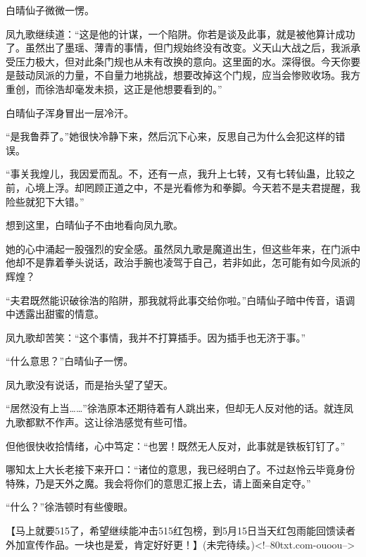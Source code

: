 \begin{this_body}
白晴仙子微微一愣。

凤九歌继续道：“这是他的计谋，一个陷阱。你若是谈及此事，就是被他算计成功了。虽然出了墨瑶、薄青的事情，但门规始终没有改变。义天山大战之后，我派承受压力极大，但对此条门规也从未有改换的意向。这里面的水。深得很。今天你要是鼓动凤派的力量，不自量力地挑战，想要改掉这个门规，应当会惨败收场。我方重创，而徐浩却毫发未损，这正是他想要看到的。”

白晴仙子浑身冒出一层冷汗。

“是我鲁莽了。”她很快冷静下来，然后沉下心来，反思自己为什么会犯这样的错误。

“事关我煌儿，我因爱而乱。不，还有一点，我升上七转，又有七转仙蛊，比较之前，心境上浮。却罔顾正道之中，不是光看修为和拳脚。今天若不是夫君提醒，我险些就犯下大错。”

想到这里，白晴仙子不由地看向凤九歌。

她的心中涌起一股强烈的安全感。虽然凤九歌是魔道出生，但这些年来，在门派中他却不是靠着拳头说话，政治手腕也凌驾于自己，若非如此，怎可能有如今凤派的辉煌？

“夫君既然能识破徐浩的陷阱，那我就将此事交给你啦。”白晴仙子暗中传音，语调中透露出甜蜜的情意。

凤九歌却苦笑：“这个事情，我并不打算插手。因为插手也无济于事。”

“什么意思？”白晴仙子一愣。

凤九歌没有说话，而是抬头望了望天。

“居然没有上当……”徐浩原本还期待着有人跳出来，但却无人反对他的话。就连凤九歌都默不作声。这让徐浩感觉有些可惜。

但他很快收拾情绪，心中笃定：“也罢！既然无人反对，此事就是铁板钉钉了。”

哪知太上大长老接下来开口：“诸位的意思，我已经明白了。不过赵怜云毕竟身份特殊，乃是天外之魔。我会将你们的意思汇报上去，请上面亲自定夺。”

“什么？”徐浩顿时有些傻眼。

【马上就要515了，希望继续能冲击515红包榜，到5月15日当天红包雨能回馈读者外加宣传作品。一块也是爱，肯定好好更！】(未完待续。)<!--80txt.com-ouoou-->

\end{this_body}

